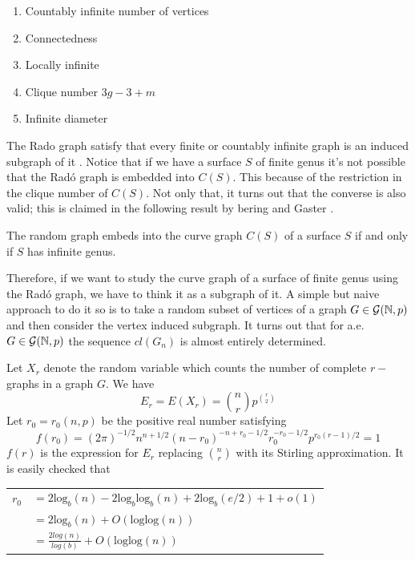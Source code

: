 \begin{enumerate}
\item Countably infinite number of vertices
\item Connectedness
\item Locally infinite
\item Clique number $3g-3+m$
\item Infinite diameter
\end{enumerate}

The Rado graph satisfy that every finite or countably infinite graph is an induced subgraph of it \cite{DarReferenciaAqui1}. Notice that if we have a surface $S$ of finite genus it's not possible that the Radó graph is embedded into $C(S)$. This because of the restriction in the clique number of $C(S)$. Not only that, it turns out that the converse is also valid; this is claimed in the following result by bering and Gaster \cite{}.

\begin{theorem}
The random graph embeds into the curve graph $C(S)$ of a surface $S$ if and only if $S$ has infinite genus.
\end{theorem}

Therefore, if we want to study the curve graph of a surface of finite genus using the Radó graph, we have to think it as a subgraph of it. A simple but naive approach to do it so is to take a random subset of vertices of a graph $G\in \mathcal{G}(\mathbb{N}, p)$ and then consider the vertex induced subgraph. It turns out that for a.e. $G\in \mathcal{G}(\mathbb{N}, p)$ the sequence $cl(G_n)$ is almost entirely determined.

Let $X_r$ denote the random variable which counts the number of complete $r-$graphs in a graph $G$. We have
$$E_{r} = E(X_r) = \binom{n}{r}p^{\binom{r}{2}}$$
Let $r_0 = r_0(n,p)$ be the positive real number satisfying
$$f (r_0) = (2\pi)^{- 1/2} n^{n+ 1/2} (n - r_0)^{-n+r_0-1/2} r_0^{-r_0- 1/2} p^{r_0(r- 1)/2} =1$$
$f(r)$ is the expression for $E_r$ replacing $\binom{n}{r}$ with its Stirling approximation.
It is easily checked that
\begin{center}
\begin{tabular}{ r l }
$r_0$ & $ = 2 \text{log}_{b}(n) - 2 \text{log}_{b} \text{log}_{b}(n) + 2 \text{log}_{b}(e/ 2) + 1 + o(1)$ \\
& $= 2 \text{log}_{b}(n) + O(\text{loglog} (n))$\\
& $= \frac{2log(n)}{log(b)} + O(\text{loglog}(n))$
\end{tabular}
\end{center}

